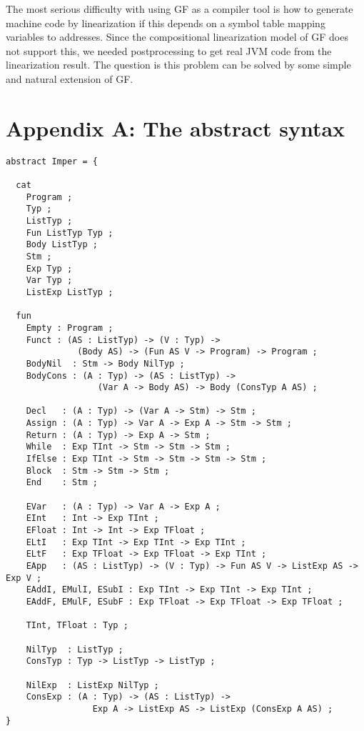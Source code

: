 \documentclass[12pt]{article}
\begin{document}
The most serious difficulty with using GF as a compiler tool
is how to generate machine code by linearization if this depends on
a symbol table mapping variables to addresses.
Since the compositional linearization model of GF does not
support this, we needed postprocessing to get real JVM code
from the linearization result. The question is this problem can
be solved by some simple and natural extension of GF.








\newpage
\section*{Appendix A: The abstract syntax}

\small
\begin{verbatim}
abstract Imper = {

  cat
    Program ;
    Typ ;
    ListTyp ;
    Fun ListTyp Typ ;
    Body ListTyp ;
    Stm ;
    Exp Typ ;
    Var Typ ;
    ListExp ListTyp ;

  fun
    Empty : Program ;
    Funct : (AS : ListTyp) -> (V : Typ) -> 
              (Body AS) -> (Fun AS V -> Program) -> Program ;
    BodyNil  : Stm -> Body NilTyp ;
    BodyCons : (A : Typ) -> (AS : ListTyp) -> 
                  (Var A -> Body AS) -> Body (ConsTyp A AS) ;

    Decl   : (A : Typ) -> (Var A -> Stm) -> Stm ;
    Assign : (A : Typ) -> Var A -> Exp A -> Stm -> Stm ;
    Return : (A : Typ) -> Exp A -> Stm ;
    While  : Exp TInt -> Stm -> Stm -> Stm ;
    IfElse : Exp TInt -> Stm -> Stm -> Stm -> Stm ;
    Block  : Stm -> Stm -> Stm ;
    End    : Stm ;

    EVar   : (A : Typ) -> Var A -> Exp A ;
    EInt   : Int -> Exp TInt ;
    EFloat : Int -> Int -> Exp TFloat ;
    ELtI   : Exp TInt -> Exp TInt -> Exp TInt ;
    ELtF   : Exp TFloat -> Exp TFloat -> Exp TInt ;
    EApp   : (AS : ListTyp) -> (V : Typ) -> Fun AS V -> ListExp AS -> Exp V ;
    EAddI, EMulI, ESubI : Exp TInt -> Exp TInt -> Exp TInt ;
    EAddF, EMulF, ESubF : Exp TFloat -> Exp TFloat -> Exp TFloat ;

    TInt, TFloat : Typ ;

    NilTyp  : ListTyp ;
    ConsTyp : Typ -> ListTyp -> ListTyp ;

    NilExp  : ListExp NilTyp ;
    ConsExp : (A : Typ) -> (AS : ListTyp) -> 
                 Exp A -> ListExp AS -> ListExp (ConsExp A AS) ;
}
\end{verbatim}
\normalsize
\newpage
\end{document}

